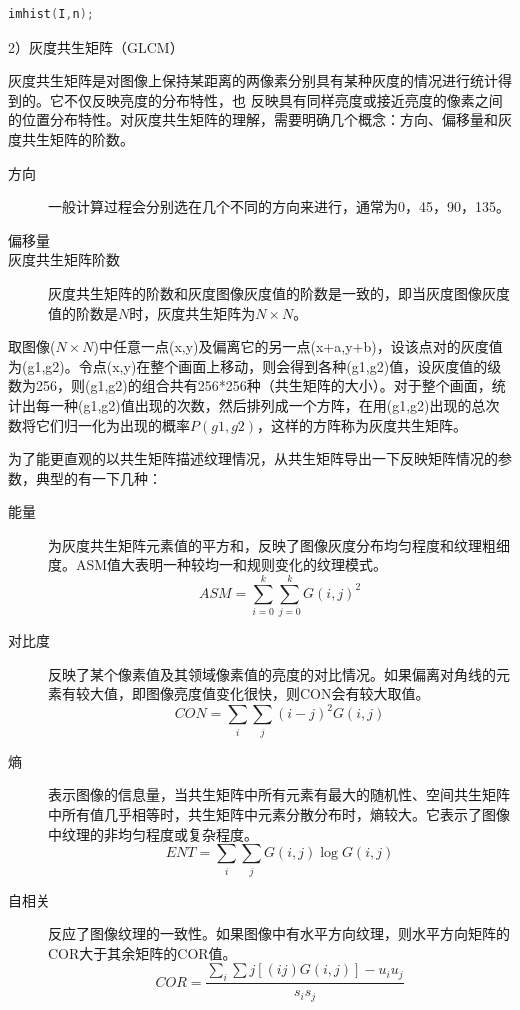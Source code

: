 \documentclass[12pt]{article}
\begin{document}
    \begin{lstlisting}[language=C++]
    imhist(I,n);
    \end{lstlisting}
    
2）灰度共生矩阵（GLCM）

灰度共生矩阵是对图像上保持某距离的两像素分别具有某种灰度的情况进行统计得到的。它不仅反映亮度的分布特性，也
反映具有同样亮度或接近亮度的像素之间的位置分布特性。对灰度共生矩阵的理解，需要明确几个概念：方向、偏移量和灰度共生矩阵的阶数。
\begin{description}
    \item[方向] 一般计算过程会分别选在几个不同的方向来进行，通常为0，45，90，135。
    \item[偏移量] 
    \item[灰度共生矩阵阶数] 灰度共生矩阵的阶数和灰度图像灰度值的阶数是一致的，即当灰度图像灰度值的阶数是$N$时，灰度共生矩阵为$N \times N$。
\end{description}

 取图像($N \times N$)中任意一点(x,y)及偏离它的另一点(x+a,y+b)，设该点对的灰度值为(g1,g2)。令点(x,y)在整个画面上移动，则会得到各种(g1,g2)值，设灰度值的级数为256，则(g1,g2)的组合共有256*256种（共生矩阵的大小）。对于整个画面，统计出每一种(g1,g2)值出现的次数，然后排列成一个方阵，在用(g1,g2)出现的总次数将它们归一化为出现的概率$P(g1,g2)$，这样的方阵称为灰度共生矩阵。
 
 为了能更直观的以共生矩阵描述纹理情况，从共生矩阵导出一下反映矩阵情况的参数，典型的有一下几种：
 \begin{description}
     \item[能量] 为灰度共生矩阵元素值的平方和，反映了图像灰度分布均匀程度和纹理粗细度。ASM值大表明一种较均一和规则变化的纹理模式。
         \begin{displaymath}
             ASM=\sum_{i=0}^{k}\sum_{j=0}^{k}G(i,j)^{2}
         \end{displaymath}
     \item[对比度] 反映了某个像素值及其领域像素值的亮度的对比情况。如果偏离对角线的元素有较大值，即图像亮度值变化很快，则CON会有较大取值。
         \begin{displaymath}
             CON=\sum_{i}\sum_{j}(i-j)^{2}G(i,j)
         \end{displaymath}
     \item[熵] 表示图像的信息量，当共生矩阵中所有元素有最大的随机性、空间共生矩阵中所有值几乎相等时，共生矩阵中元素分散分布时，熵较大。它表示了图像中纹理的非均匀程度或复杂程度。 
         \begin{displaymath}
             ENT=\sum_{i}\sum_{j}G(i,j)\log G(i,j)
         \end{displaymath}
     \item[自相关] 反应了图像纹理的一致性。如果图像中有水平方向纹理，则水平方向矩阵的COR大于其余矩阵的COR值。
         \begin{displaymath}
             COR=\frac{\sum_{i}\sum{j}[(ij)G(i,j)]-u_{i}u_{j}}{s_{i}s_{j}}
         \end{displaymath}
 \end{description}
 
\end{document}
